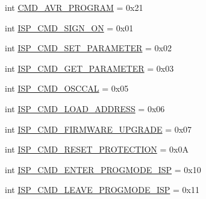 \begin{DoxyCompactItemize}
\item 
int \hyperlink{classsoftware_1_1chipwhisperer_1_1hardware_1_1naeusb_1_1programmer__avr_1_1AVRISP_a40661fbd64dc34b859bda177db0a3f2a}{C\+M\+D\+\_\+\+A\+V\+R\+\_\+\+P\+R\+O\+G\+R\+A\+M} = 0x21
\item 
int \hyperlink{classsoftware_1_1chipwhisperer_1_1hardware_1_1naeusb_1_1programmer__avr_1_1AVRISP_a9441c40b32499dd69a2fc11e87f2e206}{I\+S\+P\+\_\+\+C\+M\+D\+\_\+\+S\+I\+G\+N\+\_\+\+O\+N} = 0x01
\item 
int \hyperlink{classsoftware_1_1chipwhisperer_1_1hardware_1_1naeusb_1_1programmer__avr_1_1AVRISP_a47f367c9a55aeff98b7de06c28a7a15c}{I\+S\+P\+\_\+\+C\+M\+D\+\_\+\+S\+E\+T\+\_\+\+P\+A\+R\+A\+M\+E\+T\+E\+R} = 0x02
\item 
int \hyperlink{classsoftware_1_1chipwhisperer_1_1hardware_1_1naeusb_1_1programmer__avr_1_1AVRISP_a70ac60ef49cbbb3fc0bb36cae9bdae1d}{I\+S\+P\+\_\+\+C\+M\+D\+\_\+\+G\+E\+T\+\_\+\+P\+A\+R\+A\+M\+E\+T\+E\+R} = 0x03
\item 
int \hyperlink{classsoftware_1_1chipwhisperer_1_1hardware_1_1naeusb_1_1programmer__avr_1_1AVRISP_a49931f1ff3ca7f3fc5582e49a402c890}{I\+S\+P\+\_\+\+C\+M\+D\+\_\+\+O\+S\+C\+C\+A\+L} = 0x05
\item 
int \hyperlink{classsoftware_1_1chipwhisperer_1_1hardware_1_1naeusb_1_1programmer__avr_1_1AVRISP_a67f5e35e8a1fe59396fc6fcace808c56}{I\+S\+P\+\_\+\+C\+M\+D\+\_\+\+L\+O\+A\+D\+\_\+\+A\+D\+D\+R\+E\+S\+S} = 0x06
\item 
int \hyperlink{classsoftware_1_1chipwhisperer_1_1hardware_1_1naeusb_1_1programmer__avr_1_1AVRISP_a5976512e748373668f2a69c6107c77fa}{I\+S\+P\+\_\+\+C\+M\+D\+\_\+\+F\+I\+R\+M\+W\+A\+R\+E\+\_\+\+U\+P\+G\+R\+A\+D\+E} = 0x07
\item 
int \hyperlink{classsoftware_1_1chipwhisperer_1_1hardware_1_1naeusb_1_1programmer__avr_1_1AVRISP_a2f149ae82bea13e55a9dd63bf98fbd89}{I\+S\+P\+\_\+\+C\+M\+D\+\_\+\+R\+E\+S\+E\+T\+\_\+\+P\+R\+O\+T\+E\+C\+T\+I\+O\+N} = 0x0\+A
\item 
int \hyperlink{classsoftware_1_1chipwhisperer_1_1hardware_1_1naeusb_1_1programmer__avr_1_1AVRISP_a03f6d1050aa506a68015843a7a9657d4}{I\+S\+P\+\_\+\+C\+M\+D\+\_\+\+E\+N\+T\+E\+R\+\_\+\+P\+R\+O\+G\+M\+O\+D\+E\+\_\+\+I\+S\+P} = 0x10
\item 
int \hyperlink{classsoftware_1_1chipwhisperer_1_1hardware_1_1naeusb_1_1programmer__avr_1_1AVRISP_a6fe54b4a6c344eea926a3de12e1465fb}{I\+S\+P\+\_\+\+C\+M\+D\+\_\+\+L\+E\+A\+V\+E\+\_\+\+P\+R\+O\+G\+M\+O\+D\+E\+\_\+\+I\+S\+P} = 0x11

\end{DoxyCompactItemize}
